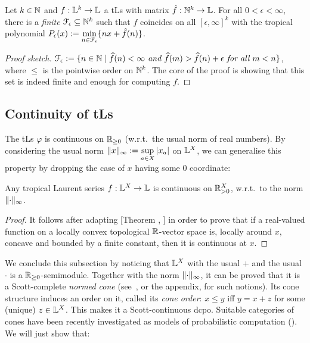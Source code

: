 \begin{theorem}\label{theorem:fepsilon}
 Let $k\in\mathbb{N}$ and $f:\mathbb{L}^k\to\mathbb{L}$ a tLs with matrix $\hat{f}:\mathbb{N}^k\to\mathbb{L}$.
 For all $0<\epsilon<\infty$, there is a \emph{finite} $\mathcal{F}_\epsilon \subseteq \mathbb{N}^k$ such that 
% 
$f$ coincides on all $[\epsilon,\infty]^k$ with the tropical {polynomial} $P_\epsilon(x):=\min\limits_{n\in \mathcal{F}_\epsilon}\{nx+\hat{f}(n)\}$.
\end{theorem}
\begin{proof}[Proof sketch]
\mbox{$\mathcal{F}_\epsilon:=\{n\in\mathbb{N} \mid
\widehat f(n)<\infty \textit{ and } 
\widehat f(m)> \widehat f(n)+\epsilon \textit{ for all } m<n\}$}, where $\leq$ is the pointwise order on $\mathbb{N}^k$.
The core of the proof is showing that this set is indeed finite and enough for computing $f$.
\end{proof}




\subsection{Continuity of tLs}\label{subsec:cont}%

The tLs $\varphi$ is continuous on $\mathbb{R}_{\geq0}$ (w.r.t.\ the usual norm of real numbers).
By considering the usual norm $\lVert x\rVert_\infty:=\sup\limits_{a\in X} \left\lvert x_a\right\rvert$ on $\mathbb{L}^X$, we can generalise this property by dropping the case of $x$ having some $0$ coordinate:

\begin{theorem}\label{thm:cont}
 Any tropical Laurent series $f:\mathbb{L}^X\to\mathbb{L}$ is continuous on $\mathbb{R}_{>0}^X$, w.r.t.\ to the norm $\lVert\cdot\rVert_\infty$.
\end{theorem}
\begin{proof}
 It follows after adapting [Theorem , \cite{}] in order to prove that if a real-valued function on a locally convex topological $\mathbb{R}$-vector space is, locally around $x$, concave and bounded by a finite constant, then it is continuous at $x$.
\end{proof}

We conclude this subsection by noticing that $\mathbb{L}^X$ with the usual $+$ and the usual $\cdot$ is a $\mathbb{R}_{\geq0}$-semimodule.
Together with the norm $\lVert\cdot\rVert_\infty$, it can be proved that it is a Scott-complete \emph{normed cone} (see~\cite{Selinger2004}, or the appendix, for such notions).
Its cone structure induces an order on it, called its \emph{cone order}:
$x\leq y$ iff $y=x+z$ for some (unique) $z\in\mathbb{L}^X$.
This makes it a Scott-continuous dcpo.
Suitable categories of cones have been recently investigated as models of probabilistic computation (\cite{Crubillie2018, EhrPagTas2018, Ehrhard2020}).
We will just show that:

